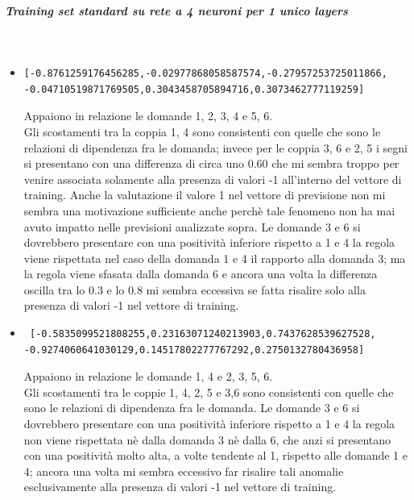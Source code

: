 \documentclass[10pt,a4paper]{article}
\begin{document}
\subparagraph{Training set standard su rete a 4 neuroni per 1 unico layers}\mbox{}
\label{Training set standard su rete a 4 neuroni per 1 unico layers}
\\
\begin{itemize}
\item \begin{verbatim}[-0.8761259176456285,-0.02977868058587574,-0.27957253725011866,
-0.04710519871769505,0.3043458705894716,0.3073462777119259]
\end{verbatim}
Appaiono in relazione le domande 1, 2, 3, 4  e 5, 6.\\
Gli scostamenti tra la coppia 1, 4 sono consistenti con quelle che sono le relazioni di dipendenza fra le domanda; invece per le coppia 3, 6 e 2, 5 i segni si presentano con una differenza di circa uno 0.60 che mi sembra troppo per venire associata solamente alla presenza di valori -1 all'interno del vettore di training. Anche la valutazione il valore 1 nel vettore di previsione non mi sembra una motivazione sufficiente anche perch\`e tale fenomeno non ha mai avuto impatto nelle previsioni analizzate sopra.
Le domande 3 e 6 si dovrebbero presentare con una positivit\`a inferiore rispetto a 1 e 4 la regola viene rispettata nel caso della domanda 1 e 4 il rapporto alla domanda 3; ma la regola viene sfasata dalla domanda 6 e ancora una volta la differenza oscilla tra lo 0.3 e lo 0.8 mi sembra eccessiva se fatta risalire solo alla presenza di valori -1 nel vettore di training.

\item \begin{verbatim} [-0.5835099521808255,0.23163071240213903,0.7437628539627528,
-0.9274060641030129,0.14517802277767292,0.2750132780436958]
\end{verbatim}
Appaiono in relazione le domande 1, 4 e 2, 3, 5, 6.\\
Gli scostamenti tra le coppie 1, 4, 2, 5 e 3,6  sono consistenti con quelle che sono le relazioni di dipendenza fra le domanda.
Le domande 3 e 6 si dovrebbero presentare con una positivit\`a inferiore rispetto a 1 e 4 la regola non viene rispettata n\`e dalla domanda 3 n\`e dalla 6, che anzi si presentano con una positivit\`a molto alta, a volte tendente al 1, rispetto alle domande 1 e 4; ancora una volta mi sembra eccessivo far risalire tali anomalie esclusivamente alla presenza di valori -1 nel vettore di training.


\end{itemize}
\end{document}
